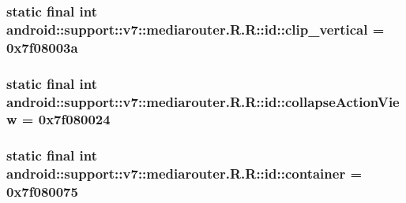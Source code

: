 \hypertarget{classandroid_1_1support_1_1v7_1_1mediarouter_1_1_r_1_1id_b050fcb49609527e465e8f2033efc49b}{
\subsubsection[{clip\_\-vertical}]{\setlength{\rightskip}{0pt plus 5cm}static final int android::support::v7::mediarouter.R.R::id::clip\_\-vertical = 0x7f08003a}}
\label{classandroid_1_1support_1_1v7_1_1mediarouter_1_1_r_1_1id_b050fcb49609527e465e8f2033efc49b}


\hypertarget{classandroid_1_1support_1_1v7_1_1mediarouter_1_1_r_1_1id_1753da01654f5db6f9d7e7eb26a6f156}{
\subsubsection[{collapseActionView}]{\setlength{\rightskip}{0pt plus 5cm}static final int android::support::v7::mediarouter.R.R::id::collapseActionView = 0x7f080024}}
\label{classandroid_1_1support_1_1v7_1_1mediarouter_1_1_r_1_1id_1753da01654f5db6f9d7e7eb26a6f156}


\hypertarget{classandroid_1_1support_1_1v7_1_1mediarouter_1_1_r_1_1id_23cad1b0dc0320c30d15eb38a24f5ed4}{
\subsubsection[{container}]{\setlength{\rightskip}{0pt plus 5cm}static final int android::support::v7::mediarouter.R.R::id::container = 0x7f080075}}
\label{classandroid_1_1support_1_1v7_1_1mediarouter_1_1_r_1_1id_23cad1b0dc0320c30d15eb38a24f5ed4}


